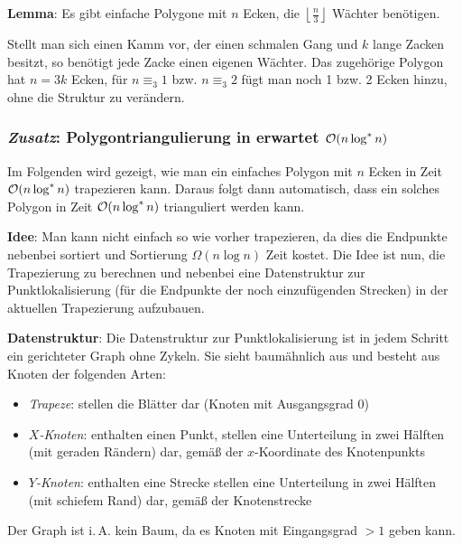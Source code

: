 \textbf{Lemma}:
Es gibt einfache Polygone mit $n$ Ecken,
die $\left\lfloor \frac{n}{3} \right\rfloor$ Wächter benötigen.

\begin{Beweis}
    Stellt man sich einen Kamm vor, der einen schmalen Gang und $k$ lange Zacken besitzt,
    so benötigt jede Zacke einen eigenen Wächter.
    Das zugehörige Polygon hat $n = 3k$ Ecken, für $n \equiv_3 1$ bzw. $n \equiv_3 2$
    fügt man noch 1 bzw. 2 Ecken hinzu, ohne die Struktur zu verändern.
\end{Beweis}

\pagebreak

\subsubsection{%
    \emph{Zusatz}: Polygontriangulierung in erwartet
    \texorpdfstring{$\mathcal{O}(n\log^\ast n)$}{O(n log* n)}%
}

Im Folgenden wird gezeigt, wie man ein einfaches Polygon mit $n$ Ecken in Zeit
$\mathcal{O}(n \log^\ast n)$ trapezieren kann.
Daraus folgt dann automatisch, dass ein solches Polygon in Zeit $\mathcal{O}(n \log^\ast n)$
trianguliert werden kann.

\textbf{Idee}:
Man kann nicht einfach so wie vorher trapezieren, da dies die Endpunkte nebenbei sortiert und
Sortierung $\Omega(n \log n)$ Zeit kostet.
Die Idee ist nun, die Trapezierung zu berechnen und nebenbei eine Datenstruktur zur
Punktlokalisierung (für die Endpunkte der noch einzufügenden Strecken)
in der aktuellen Trapezierung aufzubauen.

\textbf{Datenstruktur}:
Die Datenstruktur zur Punktlokalisierung ist in jedem Schritt ein gerichteter Graph ohne Zykeln.
Sie sieht baumähnlich aus und besteht aus Knoten der folgenden Arten:
\begin{itemize}
    \item
    \emph{Trapeze}:
    stellen die Blätter dar (Knoten mit Ausgangsgrad $0$)
    
    \item
    \emph{$X$-Knoten}:
    enthalten einen Punkt,
    stellen eine Unterteilung in zwei Hälften
    (mit geraden Rändern) dar, gemäß der $x$-Koordinate des Knotenpunkts
    
    \item
    \emph{$Y$-Knoten}:
    enthalten eine Strecke
    stellen eine Unterteilung in zwei Hälften
    (mit schiefem Rand) dar, gemäß der Knotenstrecke
\end{itemize}
Der Graph ist i.\,A. kein Baum, da es Knoten mit Eingangsgrad $> 1$ geben kann.

